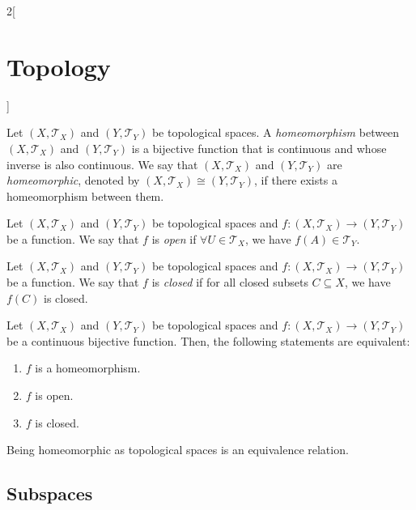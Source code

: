 \documentclass[../../../main.tex]{subfiles}
\begin{document}
\begin{multicols}{2}[\section{Topology}]
\begin{definition}
    Let $(X,\mathcal{T}_X)$ and $(Y,\mathcal{T}_Y)$ be topological spaces. A \textit{homeomorphism} between $(X,\mathcal{T}_X)$ and $(Y,\mathcal{T}_Y)$ is a bijective function that is continuous and whose inverse is also continuous. We say that $(X,\mathcal{T}_X)$ and $(Y,\mathcal{T}_Y)$ are \textit{homeomorphic}, denoted by $(X,\mathcal{T}_X)\cong(Y,\mathcal{T}_Y)$, if there exists a homeomorphism between them.
  \end{definition}
  \begin{definition}
    Let $(X,\mathcal{T}_X)$ and $(Y,\mathcal{T}_Y)$ be topological spaces and $f:(X,\mathcal{T}_X)\rightarrow (Y,\mathcal{T}_Y)$ be a function. We say that $f$ is \textit{open} if $\forall U\in\mathcal{T}_X$, we have $f(A)\in \mathcal{T}_Y$.
  \end{definition}
  \begin{definition}
    Let $(X,\mathcal{T}_X)$ and $(Y,\mathcal{T}_Y)$ be topological spaces and $f:(X,\mathcal{T}_X)\rightarrow (Y,\mathcal{T}_Y)$ be a function. We say that $f$ is \textit{closed} if for all closed subsets $C\subseteq X$, we have $f(C)$ is closed.
  \end{definition}
  \begin{prop}
    Let $(X,\mathcal{T}_X)$ and $(Y,\mathcal{T}_Y)$ be topological spaces and $f:(X,\mathcal{T}_X)\rightarrow (Y,\mathcal{T}_Y)$ be a continuous bijective function. Then, the following statements are equivalent:
    \begin{enumerate}
      \item $f$ is a homeomorphism.
      \item $f$ is open.
      \item $f$ is closed.
    \end{enumerate}
  \end{prop}
  \begin{prop}
    Being homeomorphic as topological spaces is an equivalence relation.
  \end{prop}
  \subsection{Subspaces}

\end{multicols}
\end{document}
